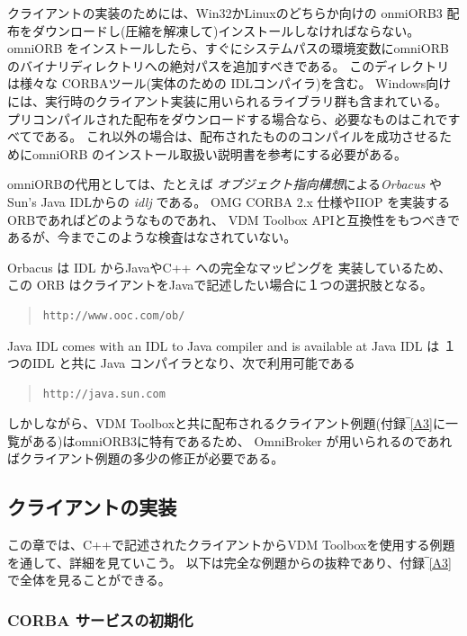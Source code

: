 \documentclass[\pformat,12pt]{jarticle}
\begin{document}
クライアントの実装のためには、Win32かLinuxのどちらか向けの onmiORB3 配布をダウンロードし(圧縮を解凍して)インストールしなければならない。
omniORB をインストールしたら、すぐにシステムパスの環境変数にomniORBのバイナリディレクトリへの絶対パスを追加すべきである。
このディレクトリは様々な CORBAツール(実体のための IDLコンパイラ)を含む。
Windows向けには、実行時のクライアント実装に用いられるライブラリ群も含まれている。
プリコンパイルされた配布をダウンロードする場合なら、必要なものはこれですべてである。
これ以外の場合は、配布されたもののコンパイルを成功させるためにomniORB のインストール取扱い説明書を参考にする必要がある。

omniORBの代用としては、たとえば {\em オブジェクト指向構想}による{\em Orbacus} や Sun's Java IDLからの {\em idlj} である。
 OMG CORBA 2.x 仕様やIIOP を実装するORBであればどのようなものであれ、 VDM Toolbox APIと互換性をもつべきであるが、今までこのような検査はなされていない。

Orbacus は IDL からJavaやC++ への完全なマッピングを 実装しているため、この ORB はクライアントをJavaで記述したい場合に１つの選択肢となる。

\begin{quote}
\begin{verbatim}    
http://www.ooc.com/ob/ 
\end{verbatim}
\end{quote}


Java IDL comes with an IDL to Java compiler and is available
at
Java IDL は １つのIDL と共に Java コンパイラとなり、次で利用可能である

\begin{quote}
\begin{verbatim}    
http://java.sun.com 
\end{verbatim}
\end{quote}

しかしながら、VDM Toolboxと共に配布されるクライアント例題(付録‾\ref{A3}に一覧がある)はomniORB3に特有であるため、 OmniBroker が用いられるのであればクライアント例題の多少の修正が必要である。

\subsection{クライアントの実装}

この章では、C++で記述されたクライアントからVDM Toolboxを使用する例題を通して、詳細を見ていこう。
以下は完全な例題からの抜粋であり、付録‾\ref{A3}で全体を見ることができる。

\subsubsection{CORBA サービスの初期化}
\end{document}
